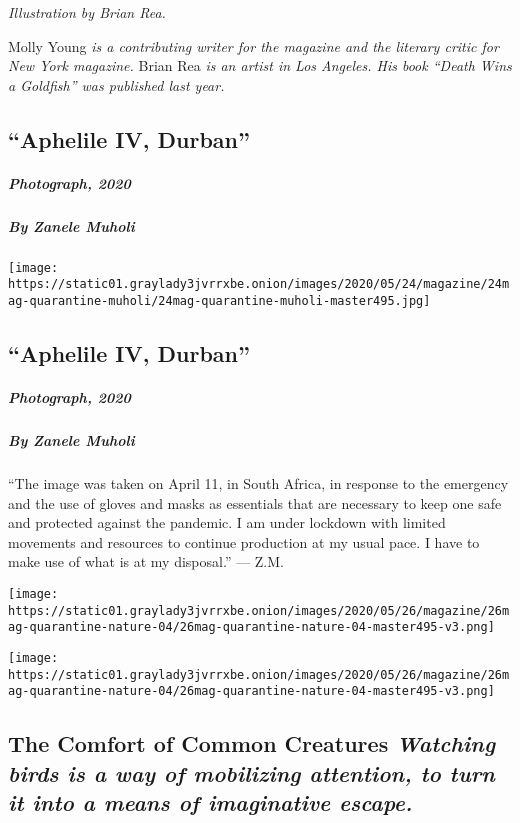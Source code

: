 \emph{Illustration by Brian Rea.}

Molly Young \emph{is a contributing writer for the magazine and the
literary critic for New York magazine.} Brian Rea \emph{is an artist in
Los Angeles. His book ``Death Wins a Goldfish'' was published last
year.}

\hypertarget{aphelile-iv-durban}{%
\subsection{``Aphelile IV, Durban''}\label{aphelile-iv-durban}}

\hypertarget{photograph-2020}{%
\subparagraph{Photograph, 2020}\label{photograph-2020}}

\hypertarget{by-zanele-muholi}{%
\subparagraph{By Zanele Muholi}\label{by-zanele-muholi}}

\texttt{[image: https://static01.graylady3jvrrxbe.onion/images/2020/05/24/magazine/24mag-quarantine-muholi/24mag-quarantine-muholi-master495.jpg]}

\hypertarget{aphelile-iv-durban-1}{%
\subsection{``Aphelile IV, Durban''}\label{aphelile-iv-durban-1}}

\hypertarget{photograph-2020-1}{%
\subparagraph{Photograph, 2020}\label{photograph-2020-1}}

\hypertarget{by-zanele-muholi-1}{%
\subparagraph{By Zanele Muholi}\label{by-zanele-muholi-1}}

``The image was taken on April 11, in South Africa, in response to the
emergency and the use of gloves and masks as essentials that are
necessary to keep one safe and protected against the pandemic. I am
under lockdown with limited movements and resources to continue
production at my usual pace. I have to make use of what is at my
disposal.'' --- Z.M.

\texttt{[image: https://static01.graylady3jvrrxbe.onion/images/2020/05/26/magazine/26mag-quarantine-nature-04/26mag-quarantine-nature-04-master495-v3.png]}

\texttt{[image: https://static01.graylady3jvrrxbe.onion/images/2020/05/26/magazine/26mag-quarantine-nature-04/26mag-quarantine-nature-04-master495-v3.png]}

\hypertarget{the-comfort-of-common-creatures-watching-birds-is-a-way-of-mobilizing-attention-to-turn-it-into-a-means-of-imaginative-escape}{%
\subsection{\texorpdfstring{The Comfort of Common Creatures
\emph{Watching birds is a way of mobilizing attention, to turn it into a
means of imaginative
escape.}}{The Comfort of Common Creatures Watching birds is a way of mobilizing attention, to turn it into a means of imaginative escape.}}\label{the-comfort-of-common-creatures-watching-birds-is-a-way-of-mobilizing-attention-to-turn-it-into-a-means-of-imaginative-escape}}

